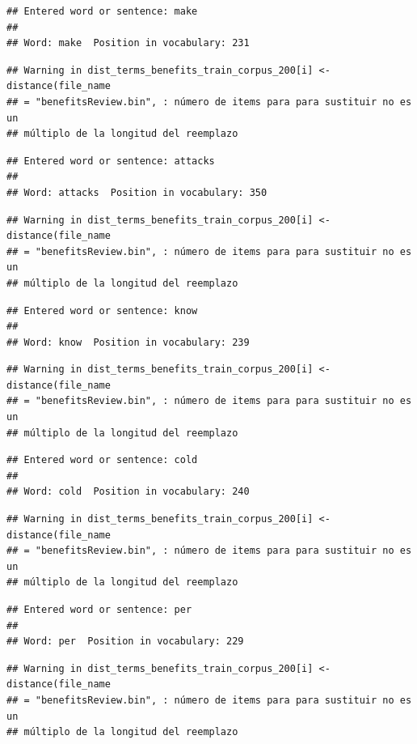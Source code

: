 \documentclass[spanish,]{article}
\begin{document}
\begin{verbatim}
## Entered word or sentence: make
## 
## Word: make  Position in vocabulary: 231
\end{verbatim}

\begin{verbatim}
## Warning in dist_terms_benefits_train_corpus_200[i] <- distance(file_name
## = "benefitsReview.bin", : número de items para para sustituir no es un
## múltiplo de la longitud del reemplazo
\end{verbatim}

\begin{verbatim}
## Entered word or sentence: attacks
## 
## Word: attacks  Position in vocabulary: 350
\end{verbatim}

\begin{verbatim}
## Warning in dist_terms_benefits_train_corpus_200[i] <- distance(file_name
## = "benefitsReview.bin", : número de items para para sustituir no es un
## múltiplo de la longitud del reemplazo
\end{verbatim}

\begin{verbatim}
## Entered word or sentence: know
## 
## Word: know  Position in vocabulary: 239
\end{verbatim}

\begin{verbatim}
## Warning in dist_terms_benefits_train_corpus_200[i] <- distance(file_name
## = "benefitsReview.bin", : número de items para para sustituir no es un
## múltiplo de la longitud del reemplazo
\end{verbatim}

\begin{verbatim}
## Entered word or sentence: cold
## 
## Word: cold  Position in vocabulary: 240
\end{verbatim}

\begin{verbatim}
## Warning in dist_terms_benefits_train_corpus_200[i] <- distance(file_name
## = "benefitsReview.bin", : número de items para para sustituir no es un
## múltiplo de la longitud del reemplazo
\end{verbatim}

\begin{verbatim}
## Entered word or sentence: per
## 
## Word: per  Position in vocabulary: 229
\end{verbatim}

\begin{verbatim}
## Warning in dist_terms_benefits_train_corpus_200[i] <- distance(file_name
## = "benefitsReview.bin", : número de items para para sustituir no es un
## múltiplo de la longitud del reemplazo
\end{verbatim}
\end{document}
